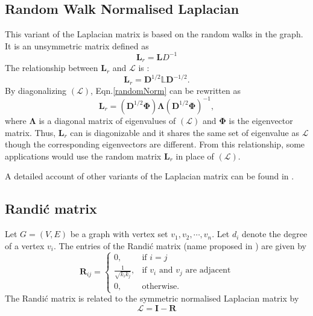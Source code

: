 \documentclass[10pt,a4paper]{article}
\theoremstyle{plain}
\theoremstyle{definition}
\begin{document}
\subsection{Random Walk Normalised Laplacian}
This variant of the Laplacian matrix is based on the random walks in the graph. It is an unsymmetric matrix defined as 
\begin{equation}
\mathbf{L}_r = \mathbf{L} D^{-1}
\end{equation}
The relationship between $\mathbf{L}_r$ and $\mathcal{L}$ is :
\begin{equation}
\mathbf{L}_r = \mathbf{D}^{1/2} \mathbb{L} \mathbf{D}^{-1/2}.
\label{randomNorm}
\end{equation}
By diagonalizing $\mathcal{(L)}$, Eqn.\ref{randomNorm} can be rewritten as 
\begin{equation}
\mathbf{L}_r = (\mathbf{D}^{1/2} \mathbf{\Phi}) \mathbf{\Lambda} (\mathbf{D}^{1/2} \mathbf{\Phi})^{-1},
\label{decomprandom}
\end{equation}
where $\mathbf{\Lambda}$ is a diagonal matrix of eigenvalues of $\mathcal{(L)}$ and $\mathbf{\Phi}$ is the eigenvector matrix. Thus, $\mathbf{L}_r$ can is diagonizable and it shares the same set of eigenvalue as $\mathcal{L}$ though the corresponding eigenvectors are different. From this relationship, some applications would use the random matrix $\mathbf{L}_r$ in place of $\mathcal{(L)}$.

A detailed account of other variants of the Laplacian matrix can be found in \citep{tsiatas2012diffusion}.

\subsection{Randi\'{c} matrix}
Let $G=(V,E)$ be a graph with vertex set ${v_1,v_2, \cdots, v_n}$. Let $d_i$ denote the degree of a vertex $v_i$. The entries of the Randi\'{c} matrix (name proposed in \citep{bozkurt2010randic}) are given by
\begin{equation*}
\mathbf{R}_{ij} = \begin{cases} 0, &\mbox{if } i = j \\
\frac{1}{\sqrt{k_i k_j}}, &\mbox{if } v_i \text{ and } v_j \text{ are adjacent} \\ 
0, & \text{otherwise}.
\end{cases}
\end{equation*}
The Randi\'{c} matrix is related to the symmetric normalised Laplacian matrix by
\begin{equation}
\mathcal{L} = \mathbf{I} -\mathbf{R}
\end{equation}
\end{document}
